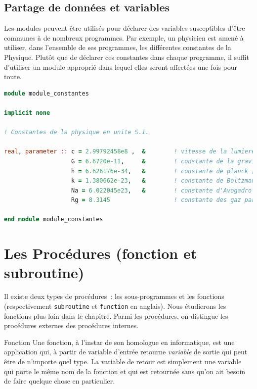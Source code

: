 \documentclass[a4paper,twoside]{article}
\begin{document}
\subsection{Partage de données et variables}
Les modules peuvent être utilisés pour déclarer des variables susceptibles d'être communes à de nombreux programmes. Par exemple, un physicien est amené à utiliser, dans l'ensemble de ses programmes, les différentes constantes de la Physique. Plutôt que de déclarer ces constantes dans chaque programme, il suffit d'utiliser un module approprié dans lequel elles seront affectées une fois pour toute.

\begin{footnotesize}
\begin{lstlisting}[language=Fortran]
module module_constantes

implicit none

! Constantes de la physique en unite S.I.

real, parameter :: c = 2.99792458e8 ,  &        ! vitesse de la lumiere [ms-1]
                   G = 6.6720e-11,     &        ! constante de la gravitation [Nm2kg-2]
                   h = 6.626176e-34,   &        ! constante de planck [JHz-1]
                   k = 1.380662e-23,   &        ! constante de Boltzmann [JK-1]
                   Na = 6.022045e23,   &        ! constante d'Avogadro [mol-1]
                   Rg = 8.3145                  ! constante des gaz parfaits [Jmol-1K-1]
 
end module module_constantes
\end{lstlisting}
\end{footnotesize}

\section{Les Procédures (fonction et subroutine)}
Il existe deux types de procédures~: les sous-programmes et les fonctions (respectivement \texttt{subroutine} et \texttt{function} en anglais). Nous étudierons les fonctions plus loin dans le chapitre. Parmi les procédures, on distingue les procé\-dures externes des procédures internes.

\begin{definition}{Fonction}
Une fonction, à l'instar de son homologue en informatique, est une application qui, à partir de variable d'entrée retourne \emph{variable} de sortie qui peut être de n'importe quel type. La variable de retour est simplement une variable qui porte le même nom de la fonction et qui est retournée sans qu'on ait besoin de faire quelque chose en particulier.
\end{definition}
\end{document}
